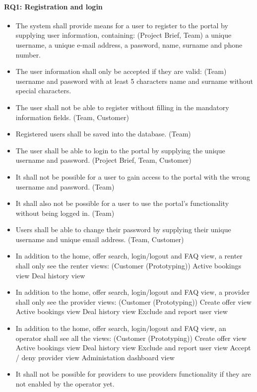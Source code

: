 \paragraph{RQ1: Registration and login}
\begin{itemize}
    \item The system shall provide means for a user to register to the portal by supplying user information, containing:  (Project Brief, Team)
        \subitem a unique username,
        \subitem a unique e-mail address,
        \subitem a password,
        \subitem name, surname and phone number.
    \item The user information shall only be accepted if they are valid: (Team)
        \subitem username and password with at least 5 characters
        \subitem name and surname without special characters.
    \item The user shall not be able to register without filling in the mandatory information fields. (Team, Customer)
    \item Registered users shall be saved into the database. (Team)
    \item The user shall be able to login to the portal by supplying the unique username and password. (Project Brief, Team, Customer)
    \item It shall not be possible for a user to gain access to the portal with the wrong username and password. (Team)
    \item It shall also not be possible for a user to use the portal's functionality without being logged in. (Team)
    \item Users shall be able to change their password by supplying their unique username and unique email address. (Team, Customer)
    \item In addition to the home, offer search, login/logout and FAQ view, a renter shall only see the renter views: (Customer (Prototyping))
        \subitem Active bookings view
        \subitem Deal history view
    \item In addition to the home, offer search, login/logout and FAQ view, a provider shall only see the provider views: (Customer (Prototyping))
        \subitem Create offer view
        \subitem Active bookings view
        \subitem Deal history view
        \subitem Exclude and report user view
    \item In addition to the home, offer search, login/logout and FAQ view, an operator shall see all the views: (Customer (Prototyping))
        \subitem Create offer view
        \subitem Active bookings view
        \subitem Deal history view
        \subitem Exclude and report user view
        \subitem Accept / deny provider view
        \subitem Administation dashboard view
    \item It shall not be possible for providers to use providers functionality if they are not enabled by the operator yet.
\end{itemize}


